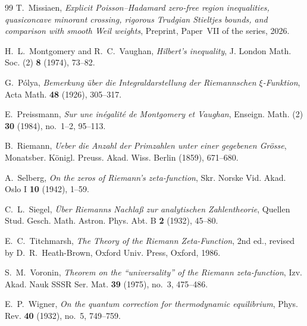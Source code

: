 \documentclass[11pt,reqno]{amsart}
\theoremstyle{definition}
\theoremstyle{remark}
\numberwithin{equation}{section}
\begin{document}
\begin{thebibliography}{99}
T.~Missiaen,
\emph{Explicit Poisson--Hadamard zero-free region inequalities, quasiconcave minorant crossing, rigorous Trudgian Stieltjes bounds, and comparison with smooth Weil weights},
Preprint, Paper~VII of the series, 2026.

H.~L.~Montgomery and R.~C.~Vaughan,
\emph{Hilbert's inequality},
J. London Math. Soc. (2) \textbf{8} (1974), 73--82.

G.~P\'olya,
\emph{Bemerkung \"uber die Integraldarstellung der Riemannschen $\xi$-Funktion},
Acta Math. \textbf{48} (1926), 305--317.

E.~Preissmann,
\emph{Sur une in\'egalit\'e de Montgomery et Vaughan},
Enseign. Math. (2) \textbf{30} (1984), no.~1--2, 95--113.

B.~Riemann,
\emph{Ueber die Anzahl der Primzahlen unter einer gegebenen Gr\"osse},
Monatsber. K\"onigl. Preuss. Akad. Wiss. Berlin (1859), 671--680.

A.~Selberg,
\emph{On the zeros of Riemann's zeta-function},
Skr. Norske Vid. Akad. Oslo I \textbf{10} (1942), 1--59.

C.~L.~Siegel,
\emph{\"Uber Riemanns Nachla\ss{} zur analytischen Zahlentheorie},
Quellen Stud. Gesch. Math. Astron. Phys. Abt. B \textbf{2} (1932), 45--80.

E.~C.~Titchmarsh,
\emph{The Theory of the Riemann Zeta-Function},
2nd ed., revised by D.~R.~Heath-Brown, Oxford Univ. Press, Oxford, 1986.

S.~M.~Voronin,
\emph{Theorem on the ``universality'' of the Riemann zeta-function},
Izv. Akad. Nauk SSSR Ser. Mat. \textbf{39} (1975), no.~3, 475--486.

E.~P.~Wigner,
\emph{On the quantum correction for thermodynamic equilibrium},
Phys. Rev. \textbf{40} (1932), no.~5, 749--759.

\end{thebibliography}
\end{document}
